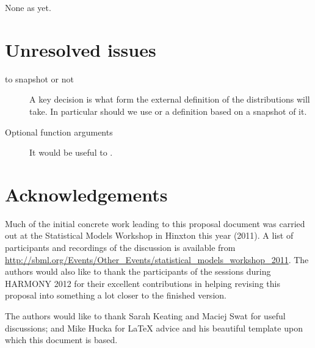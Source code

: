 \documentclass[draftspec]{sbmlpkgspec}
\begin{document}
None as yet.

\section{Unresolved issues}
\label{sec:hinxtonunresolved}

\begin{description}
\item[\uncertml to snapshot or not] A key decision is what form the
  external definition of the distributions will take. In particular
  should we use \uncertml or a definition based on a snapshot of it.
\item[Optional function arguments] It would be useful to .
\end{description}

\section{Acknowledgements}

Much of the initial concrete work leading to this proposal document
was carried out at the Statistical Models Workshop in Hinxton this
year (2011). A list of participants and recordings of the discussion
is available from
\url{http://sbml.org/Events/Other_Events/statistical_models_workshop_2011}.
The authors would also like to thank the participants of the
\distribshort sessions during HARMONY 2012 for their excellent
contributions in helping revising this proposal into something a lot
closer to the finished version.

The authors would like to thank Sarah Keating and Maciej Swat for
useful discussions; and Mike Hucka for \LaTeX{} advice and his
beautiful template upon which this document is based.



\end{document}
